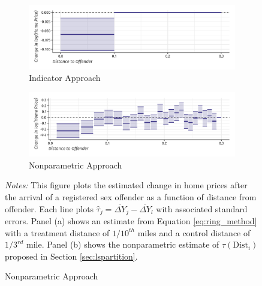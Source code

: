 \documentclass[10pt]{article}
\newcommand{\dist}{\text{Dist}}
\begin{document}
\begin{figure}[tb!]
    \caption{Effects of Offender Arrival on Home Prices \citep{Linden_Rockoff_2008}}\label{fig:lr}

    \begin{subfigure}{\textwidth}
        \caption{Indicator Approach}
        \centering
        \vspace{-2.5mm}
        \includegraphics[width=\textwidth]{../../figures/linden_rockoff_did.pdf}
    \end{subfigure}
    \hfill
    \begin{subfigure}{\textwidth}
        \caption{Nonparametric Approach}
        \centering
        \vspace{-2.5mm}
        \includegraphics[width=\textwidth]{../../figures/linden_rockoff.pdf}
    \end{subfigure}

    {\footnotesize{\it Notes:} This figure plots the estimated change in home prices after the arrival of a registered sex offender as a function of distance from offender. Each line plots $\hat{\tau}_j = \overline{\Delta Y}_j - \overline{\Delta Y}_l $ with associated standard errors. Panel (a) shows an estimate from Equation \ref{eq:ring_method} with a treatment distance of $1/10^{th}$ miles and a control distance of $1/3^{rd}$ mile. Panel (b) shows the nonparametric estimate of $\tau(\dist_i)$ proposed in Section \ref{sec:lspartition}.}
\end{figure}
\end{document}

